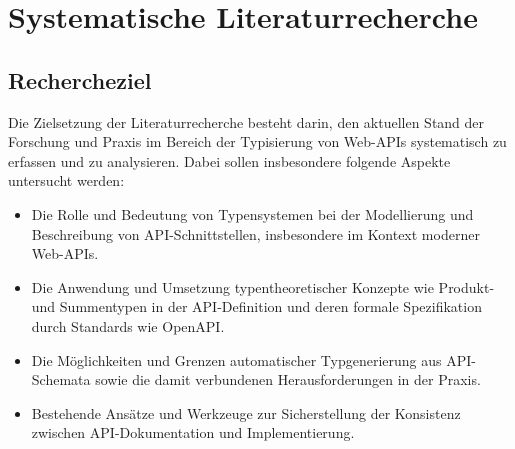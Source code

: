 
\section{Systematische Literaturrecherche}



\subsection{Rechercheziel}

Die Zielsetzung der Literaturrecherche besteht darin, den aktuellen Stand der Forschung und Praxis
im Bereich der Typisierung von Web-APIs systematisch zu erfassen und zu analysieren.
Dabei sollen insbesondere folgende Aspekte untersucht werden:

\begin{itemize}
\item Die Rolle und Bedeutung von Typensystemen bei der Modellierung und Beschreibung von API-Schnittstellen, insbesondere im Kontext moderner Web-APIs.
\item Die Anwendung und Umsetzung typentheoretischer Konzepte wie Produkt- und Summentypen in der API-Definition und deren formale Spezifikation durch Standards wie OpenAPI.
\item Die Möglichkeiten und Grenzen automatischer Typgenerierung aus API-Schemata sowie die damit verbundenen Herausforderungen in der Praxis.
\item Bestehende Ansätze und Werkzeuge zur Sicherstellung der Konsistenz zwischen API-Dokumentation und Implementierung.
\end{itemize}

